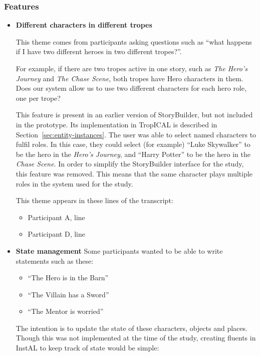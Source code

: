 \documentclass[11pt]{report}
\begin{document}
\subsubsection{Features}
\begin{itemize}
\item \textbf{Different characters in different tropes}

This theme comes from participants asking questions such as ``what happens if I
have two different heroes in two different tropes?''.

For example, if there are two tropes active in one story, such as \emph{The
  Hero's Journey} and \emph{The Chase Scene}, both tropes have Hero characters
in them. Does our system allow us to use two different characters for each hero
role, one per trope?

This feature is present in an earlier
version of StoryBuilder, but not included in the prototype. Its implementation
in TropICAL is described in Section~\ref{sec:entity-instances}. The user was able to select named characters to fulfil
roles. In this case, they could select (for example) ``Luke Skywalker'' to be
the hero in the \emph{Hero's Journey}, and ``Harry Potter'' to be the hero in
the \emph{Chase Scene}. In order to simplify the StoryBuilder interface for the
study, this feature was removed. This means that the same character plays
multiple roles in the system used for the study.

This theme appears in these lines of the transcript:

\begin{itemize}
\item Participant A, line~
\item Participant D, line~
\end{itemize}

\item \textbf{State management}
  Some participants wanted to be able to write statements such as these:

  \begin{itemize}
    \item ``The Hero is in the Barn''
    \item ``The Villain has a Sword''
    \item ``The Mentor is worried''
  \end{itemize}

  The intention is to update the state of these characters, objects and places.
  Though this was not implemented at the time of the study, creating fluents in
  InstAL to keep track of state would be simple:


\end{itemize}
\end{document}
